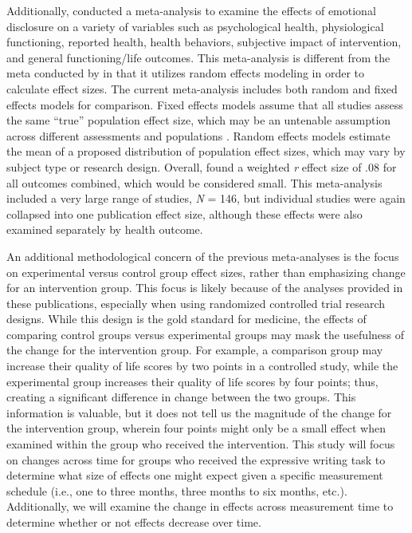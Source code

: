 \documentclass[english,man]{apa6}
\theoremstyle{definition}
\theoremstyle{definition}
\theoremstyle{definition}
\theoremstyle{remark}
\begin{document}
Additionally, \textcite{Frattaroli2006} conducted a meta-analysis to
examine the effects of emotional disclosure on a variety of variables
such as psychological health, physiological functioning, reported
health, health behaviors, subjective impact of intervention, and general
functioning/life outcomes. This meta-analysis is different from the meta
conducted by \textcite{Smyth1998} in that it utilizes random effects
modeling in order to calculate effect sizes. The current meta-analysis
includes both random and fixed effects models for comparison. Fixed
effects models assume that all studies assess the same \enquote{true}
population effect size, which may be an untenable assumption across
different assessments and populations \autocite{Borenstein2007}. Random
effects models estimate the mean of a proposed distribution of
population effect sizes, which may vary by subject type or research
design. Overall, \textcite{Frattaroli2006} found a weighted \emph{r}
effect size of .08 for all outcomes combined, which would be considered
small. This meta-analysis included a very large range of studies,
\emph{N} = 146, but individual studies were again collapsed into one
publication effect size, although these effects were also examined
separately by health outcome.

An additional methodological concern of the previous meta-analyses is
the focus on experimental versus control group effect sizes, rather than
emphasizing change for an intervention group. This focus is likely
because of the analyses provided in these publications, especially when
using randomized controlled trial research designs. While this design is
the gold standard for medicine, the effects of comparing control groups
versus experimental groups may mask the usefulness of the change for the
intervention group. For example, a comparison group may increase their
quality of life scores by two points in a controlled study, while the
experimental group increases their quality of life scores by four
points; thus, creating a significant difference in change between the
two groups. This information is valuable, but it does not tell us the
magnitude of the change for the intervention group, wherein four points
might only be a small effect when examined within the group who received
the intervention. This study will focus on changes across time for
groups who received the expressive writing task to determine what size
of effects one might expect given a specific measurement schedule (i.e.,
one to three months, three months to six months, etc.). Additionally, we
will examine the change in effects across measurement time to determine
whether or not effects decrease over time.
\end{document}
